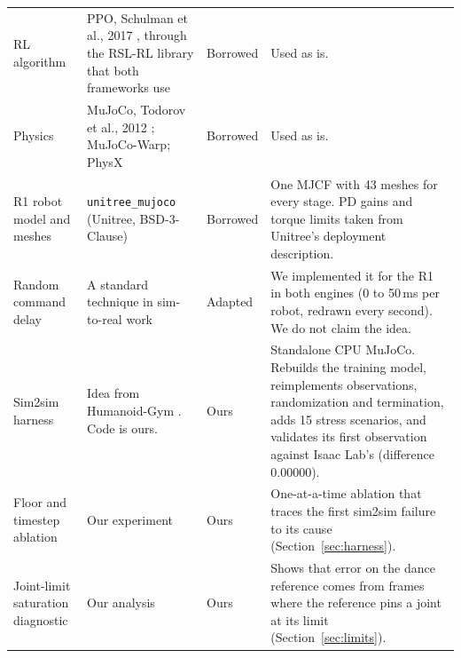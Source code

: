 \documentclass[11pt]{article}
\newcommand{\code}[1]{\texttt{#1}}
\begin{document}
{\begin{longtable}{@{}p{2.5cm}p{3.5cm}p{1.5cm}p{7.4cm}@{}}
RL algorithm & PPO, Schulman et al., 2017 \cite{ppo}, through the RSL-RL library \cite{rslrl} that both frameworks use & Borrowed & Used as is.\\
Physics & MuJoCo, Todorov et al., 2012 \cite{mujoco}; MuJoCo-Warp; PhysX & Borrowed & Used as is.\\
R1 robot model and meshes & \code{unitree\_mujoco} (Unitree, BSD-3-Clause) \cite{unitreemujoco} & Borrowed & One MJCF with 43 meshes for every stage. PD gains and torque limits taken from Unitree's deployment description.\\
Random command delay & A standard technique in sim-to-real work \cite{peng,hwangbo} & Adapted & We implemented it for the R1 in both engines (0 to 50\,ms per robot, redrawn every second). We do not claim the idea.\\
Sim2sim harness & Idea from Humanoid-Gym \cite{humanoidgym}. Code is ours. & Ours & Standalone CPU MuJoCo. Rebuilds the training model, reimplements observations, randomization and termination, adds 15 stress scenarios, and validates its first observation against Isaac Lab's (difference 0.00000).\\
Floor and timestep ablation & Our experiment & Ours & One-at-a-time ablation that traces the first sim2sim failure to its cause (Section~\ref{sec:harness}).\\
Joint-limit saturation diagnostic & Our analysis & Ours & Shows that error on the dance reference comes from frames where the reference pins a joint at its limit (Section~\ref{sec:limits}).\\
\bottomrule
\end{longtable}
}
\end{document}
